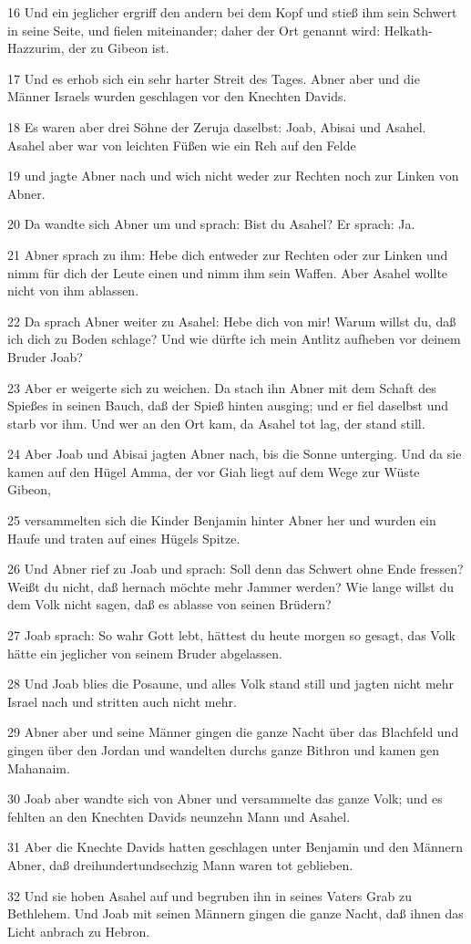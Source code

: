 \par 16 Und ein jeglicher ergriff den andern bei dem Kopf und stieß ihm sein Schwert in seine Seite, und fielen miteinander; daher der Ort genannt wird: Helkath-Hazzurim, der zu Gibeon ist.
\par 17 Und es erhob sich ein sehr harter Streit des Tages. Abner aber und die Männer Israels wurden geschlagen vor den Knechten Davids.
\par 18 Es waren aber drei Söhne der Zeruja daselbst: Joab, Abisai und Asahel. Asahel aber war von leichten Füßen wie ein Reh auf den Felde
\par 19 und jagte Abner nach und wich nicht weder zur Rechten noch zur Linken von Abner.
\par 20 Da wandte sich Abner um und sprach: Bist du Asahel? Er sprach: Ja.
\par 21 Abner sprach zu ihm: Hebe dich entweder zur Rechten oder zur Linken und nimm für dich der Leute einen und nimm ihm sein Waffen. Aber Asahel wollte nicht von ihm ablassen.
\par 22 Da sprach Abner weiter zu Asahel: Hebe dich von mir! Warum willst du, daß ich dich zu Boden schlage? Und wie dürfte ich mein Antlitz aufheben vor deinem Bruder Joab?
\par 23 Aber er weigerte sich zu weichen. Da stach ihn Abner mit dem Schaft des Spießes in seinen Bauch, daß der Spieß hinten ausging; und er fiel daselbst und starb vor ihm. Und wer an den Ort kam, da Asahel tot lag, der stand still.
\par 24 Aber Joab und Abisai jagten Abner nach, bis die Sonne unterging. Und da sie kamen auf den Hügel Amma, der vor Giah liegt auf dem Wege zur Wüste Gibeon,
\par 25 versammelten sich die Kinder Benjamin hinter Abner her und wurden ein Haufe und traten auf eines Hügels Spitze.
\par 26 Und Abner rief zu Joab und sprach: Soll denn das Schwert ohne Ende fressen? Weißt du nicht, daß hernach möchte mehr Jammer werden? Wie lange willst du dem Volk nicht sagen, daß es ablasse von seinen Brüdern?
\par 27 Joab sprach: So wahr Gott lebt, hättest du heute morgen so gesagt, das Volk hätte ein jeglicher von seinem Bruder abgelassen.
\par 28 Und Joab blies die Posaune, und alles Volk stand still und jagten nicht mehr Israel nach und stritten auch nicht mehr.
\par 29 Abner aber und seine Männer gingen die ganze Nacht über das Blachfeld und gingen über den Jordan und wandelten durchs ganze Bithron und kamen gen Mahanaim.
\par 30 Joab aber wandte sich von Abner und versammelte das ganze Volk; und es fehlten an den Knechten Davids neunzehn Mann und Asahel.
\par 31 Aber die Knechte Davids hatten geschlagen unter Benjamin und den Männern Abner, daß dreihundertundsechzig Mann waren tot geblieben.
\par 32 Und sie hoben Asahel auf und begruben ihn in seines Vaters Grab zu Bethlehem. Und Joab mit seinen Männern gingen die ganze Nacht, daß ihnen das Licht anbrach zu Hebron.

